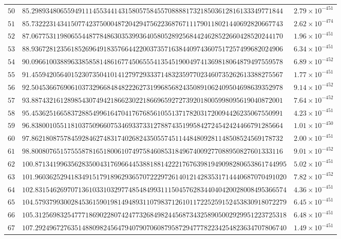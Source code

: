 \documentclass[12pt,reqno]{amsart}
\theoremstyle{remark}
\begin{document}
\begin{longtable}{clc}
$50$ & $85.2989348065594911145534414315805758455708888173218503612816133349771844$ & $2.79\times 10^{-451}$ \\
$51$ & $85.7322231434150774237500048720429475622368767111790118021440692820667743$ & $2.62\times 10^{-474}$ \\
$52$ & $87.0677531198065544877848630353993640580528925684424628522660428520244170$ & $1.96\times 10^{-451}$ \\
$53$ & $88.9367281235618526964918357664422003735716384409743607517257499682024906$ & $6.34\times 10^{-451}$ \\
$54$ & $90.0966100388963385858148616774506555413545190049741369818064879497559578$ & $6.89\times 10^{-452}$ \\
$55$ & $91.4559420564015230735041014127972933371483235977023460735262613388275567$ & $1.77\times 10^{-451}$ \\
$56$ & $92.5045366769061037329668484822262731996856824350891062409504698639352978$ & $9.14\times 10^{-452}$ \\
$57$ & $93.8874321612898543074942186623022186696592727392018005998095619040872001$ & $7.64\times 10^{-452}$ \\
$58$ & $95.4536251665837288549961647041767685610551371782031720094426235067550991$ & $4.23\times 10^{-451}$ \\
$59$ & $96.8380010551181037509660753469337331278874351995842724542424466791285664$ & $1.01\times 10^{-450}$ \\
$60$ & $97.8621808757845928462748317402682435055745114484809281148508524569178732$ & $2.00\times 10^{-451}$ \\
$61$ & $98.8008076515755587816518006107497584608531849674009277088950827601333116$ & $9.01\times 10^{-452}$ \\
$62$ & $100.8713419963562835004317696644538818814222176763981949098280653861744995$ & $5.02\times 10^{-451}$ \\
$63$ & $101.9603625294183491517918962936570722297261401214283531714440687070491020$ & $7.82\times 10^{-452}$ \\
$64$ & $102.8315462697071361033103297748548499311150457628344040420028008495366574$ & $4.36\times 10^{-451}$ \\
$65$ & $104.5793799300284536159019814948931107983712610117225259152453830918072279$ & $6.45\times 10^{-451}$ \\
$66$ & $105.3125698325477718690228074247732684982445687343258905002929951223725318$ & $6.48\times 10^{-451}$ \\
$67$ & $107.2924967276351488098245647940790706087958729477782234254823634707806740$ & $1.49\times 10^{-451}$ \\

\end{longtable}
\end{document}
